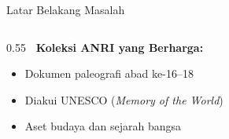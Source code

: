\documentclass[aspectratio=169,10pt,t]{beamer}
\begin{document}
\begin{frame}{Latar Belakang Masalah}
    \begin{columns}[T]
        \begin{column}{0.55\textwidth}
            \textbf{\faArchive~Koleksi ANRI yang Berharga:}
            \begin{itemize}
                \item Dokumen paleografi abad ke-16--18
                \item Diakui UNESCO (\textit{Memory of the World})
                \item Aset budaya dan sejarah bangsa
            \end{itemize}
            

\end{column}
\end{columns}
\end{frame}
\end{document}
